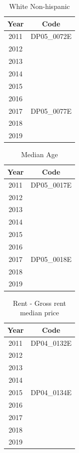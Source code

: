 \documentclass[conference]{IEEEtran}
\begin{document}
\begin{table}[htbp]
\caption{White Non-hispanic}
\begin{center}
\begin{tabular}{cc}
\hline\hline
\textbf{Year} & \textbf{Code} \\
\hline
2011 & DP05\_0072E \\
2012 & \\
2013 & \\
2014 & \\
2015 & \\
2016 & \\
\hline
2017 & DP05\_0077E\\
2018 & \\
2019 & \\
\hline\hline
\end{tabular}
\end{center}
\end{table}
\begin{table}[htbp]
\caption{Median Age}
\begin{center}
\begin{tabular}{cc}
\hline\hline
\textbf{Year} & \textbf{Code} \\
\hline
2011 & DP05\_0017E \\
2012 & \\
2013 & \\
2014 & \\
2015 & \\
2016 & \\
\hline
2017 & DP05\_0018E\\
2018 & \\
2019 & \\
\hline\hline
\end{tabular}
\end{center}
\end{table}
\begin{table}[htbp]
\caption{Rent - Gross rent median price}
\begin{center}
\begin{tabular}{cc}
\hline\hline
\textbf{Year} & \textbf{Code} \\
\hline
2011 & DP04\_0132E \\
2012 & \\
2013 & \\
2014 & \\
\hline
2015 & DP04\_0134E\\
2016 & \\
2017 & \\
2018 & \\
2019 & \\
\hline\hline
\end{tabular}
\end{center}
\end{table}
\end{document}
